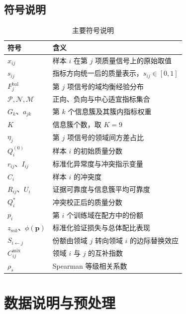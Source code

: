 \documentclass[bwprint]{gmcmthesis}
\newcommand{\TableSetup}{%
    \centering
    \small
    \setlength{\tabcolsep}{5pt}%
    \renewcommand{\arraystretch}{1.13}%
}
\begin{document}
\subsection{符号说明}
\begin{table}[htbp]
    \TableSetup
    \caption{主要符号说明}
    \renewcommand{\tabularxcolumn}[1]{m{#1}}
    \begin{tabularx}{0.94\textwidth}{@{}C{2.9cm}Y@{}}
        \toprule
        符号 & 含义 \\
        \midrule
        $x_{ij}$ & 样本 $i$ 在第 $j$ 项质量信号上的原始取值 \\
        $s_{ij}$ & 指标方向统一后的质量表示，$s_{ij}\in[0,1]$ \\
        $F_j^{\mathrm{bal}}$ & 第 $j$ 项信号的域均衡经验分布 \\
        $\mathcal{P},\mathcal{N},\mathcal{M}$ & 正向、负向与中心适宜指标集合 \\
        $G_k$、$a_{jk}$ & 第 $k$ 个信息簇及其簇内指标权重 \\
        $K$ & 信息簇个数，取 $K=9$ \\
        $\eta_j$ & 第 $j$ 项信号的领域间方差占比 \\
        $Q_i^{(0)}$ & 样本 $i$ 的初始质量分数 \\
        $r_{ij}$、$I_{ij}$ & 标准化异常度与冲突指示变量 \\
        $C_i$ & 样本 $i$ 的冲突度 \\
        $R_{ij}$、$U_i$ & 证据可靠度与信息簇平均可靠度 \\
        $Q_i^{*}$ & 冲突校正后的质量分数 \\
        $p_i$ & 第 $i$ 个训练域在配方中的份额 \\
        $z_{mk}$、$\phi(\mathbf{p})$ & 标准化验证损失与总体配比表现 \\
        $S_{i\leftarrow j}$ & 份额由领域 $j$ 转向领域 $i$ 的边际替换效应 \\
        $C_{ij}^{\mathrm{mix}}$ & 领域 $i$ 与 $j$ 的互补指数 \\
        $\rho_s$ & Spearman 等级相关系数 \\
        \bottomrule
    \end{tabularx}
\end{table}

\section{数据说明与预处理}
\end{document}
